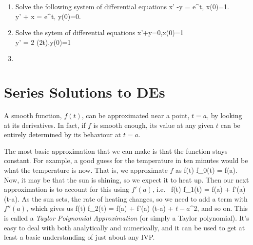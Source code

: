 \documentclass[12pt]{article}
\begin{document}
\begin{enumerate}
  \item
    Solve the following system of differential equations
    \bee
    x' -y = e^t, \qquad x(0)=1.
    \\
    y' + x = e^t, \qquad y(0)=0.
    \eee

    \item
      Solve the sytem of differential equations 
      \bee
      x'+y=0,\qquad x(0)=1
      \\
      y' = 2 \cosh(2t),\qquad y(0)=1
      \eee
    \item

\end{enumerate}

\newpage
\section{Series Solutions to DEs}

A smooth function, $f(t)$, can be approximated near a point, $t=a$, by looking 
at its derivatives. In fact, if $f$ is smooth enough, its value at any
given $t$ can be entirely determined by its behaviour at $t=a$.

The most basic approximation that we can make is that the function stays 
constant. For example, a good guess for the temperature in ten minutes would
be what the temperature is now. That is, we approximate $f$ as
\be
f(t) \approx f_0(t) = f(a).
\ee
Now, it may be that the sun is shining, so we expect it to heat up. Then our 
next approximation is to account for this using $f'(a)$, i.e.\
\be
f(t) \approx f_1(t) = f(a) + f'(a) (t-a).
\ee
As the sun sets, the rate of heating changes, so we need to add a term with
$f''(a)$, which gives us
\be
f(t) \approx f_2(t) = f(a) + f'(a) (t-a) + \(t-a\)^2,
\ee
and so on. This is called a \emph{Taylor Polynomial Approximation} (or simply a
Taylor polynomial). It's easy to deal with both analytically and numerically,
and it can be used to get at least a basic understanding of just about any IVP.
\end{document}
